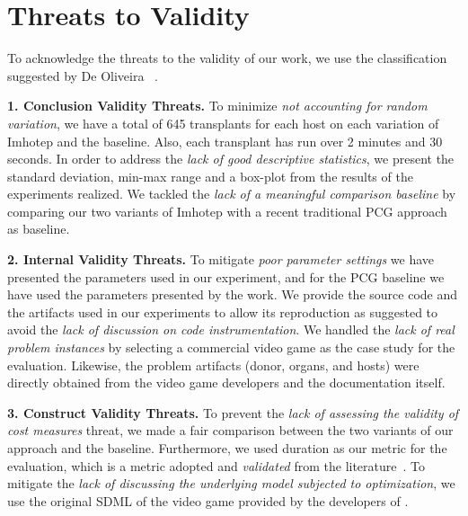 \section{Threats to Validity}
\label{sec:Threats}

To acknowledge the threats to the validity of our work, we use the classification suggested by De Oliveira \etal~\cite{}.

\textbf{1. Conclusion Validity Threats.}
To minimize \textit{not accounting for random variation}, we have a total of 645 transplants for each host on each variation of Imhotep and the baseline. Also, each transplant has run over 2 minutes and 30 seconds.
In order to address the \textit{lack of good descriptive statistics}, we present the standard deviation, min-max range and a box-plot from the results of the experiments realized.
We tackled the \textit{lack of a meaningful comparison baseline} by comparing our two variants of Imhotep with a recent traditional PCG approach as baseline. 


\textbf{2. Internal Validity Threats.}
To mitigate \textit{poor parameter settings} we have presented the parameters used in our experiment, and for the PCG baseline we have used the parameters presented by the work.
We provide the source code and the artifacts used in our experiments to allow its reproduction as suggested to avoid the \textit{lack of discussion on code instrumentation}.
We handled the \textit{lack of real problem instances} by selecting a commercial video game as the case study for the evaluation. Likewise, the problem artifacts (donor, organs, and hosts) were directly obtained from the video game developers and the documentation itself. 


\textbf{3. Construct Validity Threats.}
To prevent the \textit{lack of assessing the validity of cost measures} threat, we made a fair comparison between the two variants of our approach and the baseline. Furthermore, we used duration as our metric for the evaluation, which is a metric adopted and \textit{validated} from the literature~\cite{browne2010evolutionary}.
To mitigate the \textit{lack of discussing the underlying model subjected to optimization}, we use the original SDML of the video game provided by the developers of \CaseStudy{}.


